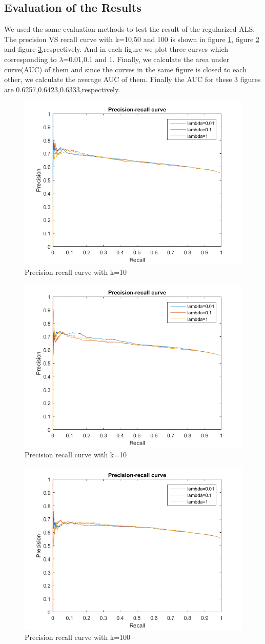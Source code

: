 \documentclass{article}
\begin{document}
\subsection{Evaluation of the Results}
We used the same evaluation methods to test the result of the regularized ALS.  The precision VS recall curve with k=10,50 and 100 is shown in figure \ref{fig:roc_k10}, figure \ref{fig:roc_k50} and  figure \ref{fig:roc_k100},respectively. And in each figure we plot three curves which corresponding to $\lambda$=0.01,0.1 and 1. Finally, we calculate the area under curve(AUC) of them and since the curves in the same figure is closed to each other, we calculate the average AUC of them. Finally the AUC for these 3 figures are 0.6257,0.6423,0.6333,respectively. \\
\begin{figure}[htbp]
\centering
\includegraphics[width=.6\textwidth]{roc_k10.png}
\caption{Precision recall curve with k=10}
\label{fig:roc_k10}
\end{figure}
\begin{figure}[htbp]
\centering
\includegraphics[width=.6\textwidth]{roc_k50.png}
\caption{Precision recall curve with k=10}
\label{fig:roc_k50}
\end{figure}
\begin{figure}[htbp]
\centering
\includegraphics[width=.6\textwidth]{roc_k100.png}
\caption{Precision recall curve with k=100}
\label{fig:roc_k100}
\end{figure}
\end{document}

